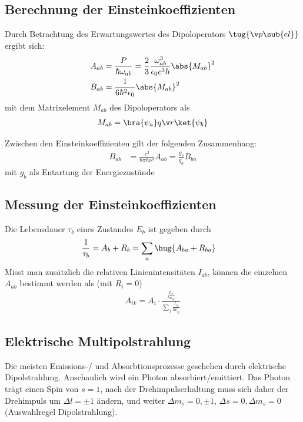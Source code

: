\documentclass[twocolumn]{summery_4.1}
\begin{document}
\subsection{Berechnung der Einsteinkoeffizienten}
Durch Betrachtung des Erwartungswertes des Dipoloperators \(\tug{\v p\sub{el}}\) ergibt sich: 
\begin{align*}
    A_{ab} &= \frac{P}{\hbar \omega_{ab}}=\frac23 \frac{\omega_{ab}^3}{\epsilon_0 c^3 h}\abs{M_{ab}}^2\\
    B_{ab} &= \frac{1}{6\hbar^2 \epsilon_0} \abs{M_{ab}}^2 
\end{align*}
mit dem Matrixelement \(M_{ab}\) des Dipoloperators als 
\begin{align*}
    M_{ab} = \bra{\psi_a} q\v r \ket{\psi_b}
\end{align*}

Zwischen den Einsteinkoeffizienten gilt der folgenden Zusammenhang:
\begin{align*}
    B_{ab} &= \frac{c^3} {8\pi h \nu^3}A_{ab} =\frac{g_b}{g_a} B_{ba}
\end{align*}
mit \(g_b\) als Entartung der Energiezustände

\subsection{Messung der Einsteinkoeffizienten}
Die Lebensdauer \(\tau_b\) eines Zustandes \(E_b\) ist gegeben durch
\begin{align*}
    \frac{1}{\tau_b} &= A_b + R_b= \sum_a \hug{A_{ba} + R_{ba}}
\end{align*}
Misst man zusätzlich die relativen Linienintensitäten \(I_{ab}\), können die einzelnen \(A_{ab}\) bestimmt werden als (mit \(R_i = 0\))
\begin{align*}
    A_{ik} = A_i \cdot \frac{\frac{I_{ik}}{h\nu_{ik}}}{\sum_j \frac{I_{ij}}{h\nu_{ij}}}
\end{align*}


\subsection{Elektrische Multipolstrahlung}
Die meisten Emissions-/ und Absorbtionsprozesse geschehen durch elektrische Dipolstrahlung. Anschaulich wird ein Photon absorbiert/emittiert. Das Photon trägt einen Spin von \(s=1\), nach der Drehimpulserhaltung muss sich daher der Drehimpuls um \(\Delta l = \pm 1\) ändern, und weiter \(\Delta m_s=0,\pm 1\), \(\Delta s = 0, \Delta m_s =0\) (Auswahlregel Dipolstrahlung).
\end{document}
